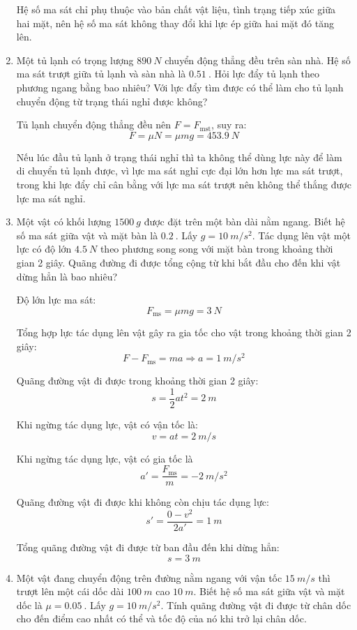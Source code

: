 \begin{enumerate}[label=\bfseries Câu \arabic*:]
	\loigiai
	{Hệ số ma sát chỉ phụ thuộc vào bản chất vật liệu, tình trạng tiếp xúc giữa hai mặt, nên hệ số ma sát không thay đổi khi lực ép giữa hai mặt đó tăng lên.
	}
	\item {}
	
	\cauhoi
	{Một tủ lạnh có trọng lượng $\SI{890}{N}$ chuyển động thẳng đều trên sàn nhà. Hệ số ma sát trượt giữa tủ lạnh và sàn nhà là $\SI{0.51}{}$. Hỏi lực đẩy tủ lạnh theo phương ngang bằng bao nhiêu? Với lực đẩy tìm được có thể làm cho tủ lạnh chuyển động từ trạng thái nghỉ được không?
		
	}
	
	\loigiai
	{Tủ lạnh chuyển động thẳng đều nên $F=F_\text{mst}$, suy ra:
		$$F=\mu N = \mu mg = \SI{453.9}{N}$$
		
	Nếu lúc đầu tủ lạnh ở trạng thái nghỉ thì ta không thể dùng lực này để làm di chuyển tủ lạnh được, vì lực ma sát nghỉ cực đại lớn hơn lực ma sát trượt, trong khi lực đẩy chỉ cân bằng với lực ma sát trượt nên không thể thắng được lực ma sát nghỉ.
	}
	\item {}
	
	\cauhoi
	{Một vật có khối lượng $\SI{1500}{g}$ được đặt trên một bàn dài nằm ngang. Biết hệ số ma sát giữa vật và mặt bàn là $\SI{0.2}{}$. Lấy $g=\SI{10}{m/s^2}$. Tác dụng lên vật một lực có độ lớn $\SI{4.5}{N}$ theo phương song song với mặt bàn trong khoảng thời gian 2 giây. Quãng đường đi được tổng cộng từ khi bắt đầu cho đến khi vật dừng hẳn là bao nhiêu?
	}
	
	\loigiai
	{
		Độ lớn lực ma sát:
		$$F_\text{ms} = \mu mg = \SI{3}{N}$$
		
		Tổng hợp lực tác dụng lên vật gây ra gia tốc cho vật trong khoảng thời gian 2 giây:
		$$F-F_\text{ms} = ma \Rightarrow a = \SI{1}{m/s^2}$$
		
		Quãng đường vật đi được trong khoảng thời gian 2 giây:
		$$s=\dfrac{1}{2}at^2 = \SI{2}{m}$$
		
		Khi ngừng tác dụng lực, vật có vận tốc là:
		$$v=at=\SI{2}{m/s}$$
		
		
		Khi ngừng tác dụng lực, vật có gia tốc là
		$$a'=\dfrac{F_\text{ms}}{m} = \SI{-2}{m/s^2}$$
		
		Quãng đường vật đi được khi không còn chịu tác dụng lực:
		$$s' = \dfrac{0-v^2}{2a'} = \SI{1}{m}$$
		
		Tổng quãng đường vật đi được từ ban đầu đến khi dừng hẳn:
		$$s=\SI{3}{m}$$
	}
	\item {}
	
	\cauhoi
	{Một vật đang chuyển động trên đường nằm ngang với vận tốc $\SI{15}{m/s}$ thì trượt lên một cái dốc dài $\SI{100}{m}$ cao $\SI{10}{m}$. Biết hệ số ma sát giữa vật và mặt dốc là $\mu = \SI{0.05}{}$. Lấy $g=\SI{10}{m/s^2}$. Tính quãng đường vật đi được từ chân dốc cho đến điểm cao nhất có thể và tốc độ của nó khi trở lại chân dốc.
	}
	

\end{enumerate}
